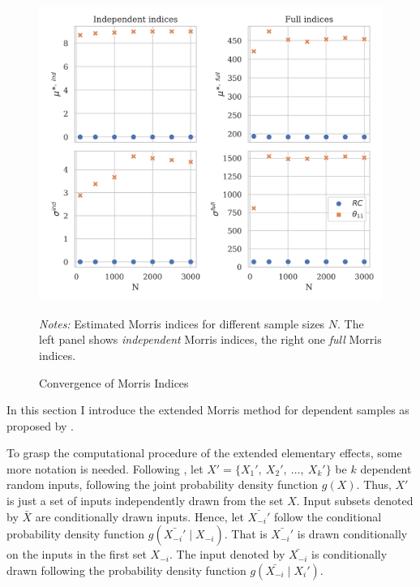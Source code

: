 \begin{figure}[t]
	\caption{Convergence of Morris Indices}
    \label{morris_convergence}
    \begin{centering}
	\vspace*{-4mm}
	\begin{centering}
	\includegraphics[scale=0.9]{../figures/morris_convergence.png}
    \end{centering}
    \end{centering}

    \small
    \textit{Notes:} Estimated Morris indices for different sample sizes $N$. The left panel shows \textit{independent} Morris indices, the right one \textit{full} Morris indices.
\end{figure}

In this section I introduce the extended Morris method for dependent samples as proposed by \citet{GM17}.

To grasp the computational procedure of the extended elementary effects, some more notation is needed. Following \citet{GM17}, let $X' = \{X_1',\ X_2',\ \dots,\ X_k'\}$ be $k$ dependent random inputs, following the joint probability density function $g(X)$. Thus, $X'$ is just a set of inputs independently drawn from the set $X$. Input subsets denoted by $\bar{X}$ are conditionally drawn inputs. Hence, let $\bar{X_{-i}'}$ follow the conditional probability density function $g(\bar{X_{-i}'} \mid X_{-i})$. That is $\bar{X_{-i}'}$ is drawn conditionally on the inputs in the first set $X_{-i}$. The input denoted by $\bar{X_{-i}}$ is conditionally drawn following the probability density function $g(\bar{X_{-i}} \mid X_i')$. %


